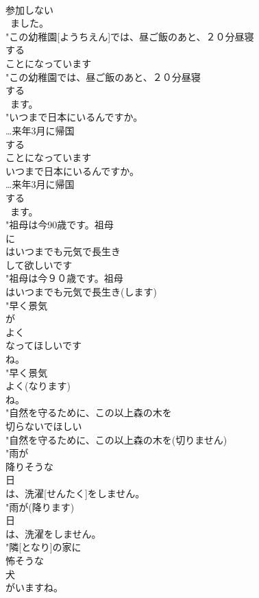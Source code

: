 \documentclass[8pt]{extreport}
\begin{document}
\begin{CJK}{UTF8}{min}
\\	参加しない
\\	~ました。
\\	"この幼稚園[ようちえん]では、昼ご飯のあと、２０分昼寝
\\	する
\\	ことになっています
\\	"この幼稚園では、昼ご飯のあと、２０分昼寝
\\	する
\\	~ます。
\\	"いつまで日本にいるんですか。
\\	…来年3月に帰国
\\	する
\\	ことになっています
\\	いつまで日本にいるんですか。
\\	…来年3月に帰国
\\	する
\\	~ます。
\\	"祖母は今90歳です。祖母
\\	に
\\	はいつまでも元気で長生き
\\	して欲しいです
\\	"祖母は今９０歳です。祖母
\\	はいつまでも元気で長生き(します)
\\	"早く景気
\\	が
\\	よく
\\	なってほしいです
\\	ね。
\\	"早く景気
\\	よく(なります)
\\	ね。
\\	"自然を守るために、この以上森の木を
\\	切らないでほしい
\\	"自然を守るために、この以上森の木を(切りません)
\\	"雨が
\\	降りそうな
\\	日
\\	は、洗濯[せんたく]をしません。
\\	"雨が(降ります)
\\	日
\\	は、洗濯をしません。
\\	"隣[となり]の家に
\\	怖そうな
\\	犬
\\	がいますね。

\end{CJK}
\end{document}

